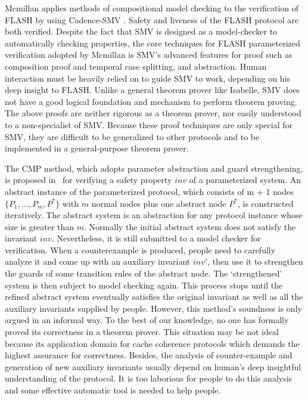 \documentclass{llncs}
\begin{document}
Mcmillan applies methods of compositional model
checking \cite{McMillan2001} to the verification of FLASH by using Cadence-SMV \cite{cadenceSMV}. %
Safety and liveness of the
FLASH protocol are both verified. Despite the fact that SMV is designed as a model-checker to automatically checking properties, the core techniques for FLASH parameterized verification adopted by Mcmillan is SMV's advanced features for proof such as composition proof and temporal case splitting, and abstraction. Human interaction must be heavily relied on to  guide SMV to work, depending on his deep insight to FLASH. Unlike a general theorem prover like Isabelle, SMV does not have a good logical foundation and mechanism to perform theorem proving. The above proofs are neither rigorous as a theorem prover, nor easily understood to a non-specialist of SMV.  Because these proof techniques are  only special for SMV,  they are  difficult to be generalized to other protocols and to be implemented in a general-purpose theorem prover.

The CMP method, which adopts parameter abstraction and guard strengthening, is proposed
in~\cite{Chou2004} for verifying a safety property $inv$ of
a parameterized system.
 An abstract instance of the parameterized protocol,  which consists of m + 1
nodes $\{P_1, \ldots , P_m, P^*\}$ with $m$ normal nodes plus one
abstract node $P^*$, is constructed iteratively. The abstract system is an
abstraction for any protocol instance whose size is greater than
$m$. Normally the initial abstract system does not satisfy the
invariant $inv$. Nevertheless, it is still submitted to a model
checker for verification. When a counterexample is produced, people need to
carefully analyze it and come up with an auxiliary invariant
$inv'$, then use it to strengthen the guards of some transition
rules of the abstract node. The `strengthened' system is then
subject to model checking again. This process stops until the
refined abstract system  eventually satisfies the original invariant
  as well as all the auxiliary invariants supplied by people. However, this method's soundness is only argued in an
informal way. To the best of our knowledge, no one has
formally proved its correctness in a theorem prover. This
situation may be not ideal because its application domain for cache
coherence protocols  which demands the highest assurance for
correctness. Besides, the analysis of counter-example and generation of new auxiliary invariants usually
 depend on human's deep insightful understanding of the protocol. It is too laborious for people to do this analysis and some effective automatic  tool is needed to help people.
\end{document}
